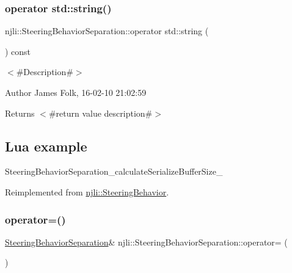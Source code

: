 \subsubsection{\texorpdfstring{operator std\+::string()}{operator std::string()}}
{\footnotesize\ttfamily njli\+::\+Steering\+Behavior\+Separation\+::operator std\+::string (\begin{DoxyParamCaption}{ }\end{DoxyParamCaption}) const\hspace{0.3cm}{\ttfamily [virtual]}}



$<$\#\+Description\#$>$ 

\begin{DoxyAuthor}{Author}
James Folk, 16-\/02-\/10 21\+:02\+:59
\end{DoxyAuthor}
\begin{DoxyReturn}{Returns}
$<$\#return value description\#$>$
\end{DoxyReturn}
\hypertarget{classnjli_1_1_steering_behavior_wander_ex1}{}\subsection{Lua example}\label{classnjli_1_1_steering_behavior_wander_ex1}

\begin{DoxyCodeInclude}
\end{DoxyCodeInclude}
Steering\+Behavior\+Separation\+\_\+calculate\+Serialize\+Buffer\+Size\+\_\+ 

Reimplemented from \mbox{\hyperlink{classnjli_1_1_steering_behavior_acd7af46e42a8a3fc1208a47f50836ac8}{njli\+::\+Steering\+Behavior}}.

\mbox{\label{classnjli_1_1_steering_behavior_separation_ab1903a1f26ca1d21e21f5610432cd94e}} 
\subsubsection{\texorpdfstring{operator=()}{operator=()}}
{\footnotesize\ttfamily \mbox{\hyperlink{classnjli_1_1_steering_behavior_separation}{Steering\+Behavior\+Separation}}\& njli\+::\+Steering\+Behavior\+Separation\+::operator= (\begin{DoxyParamCaption}\item[{const \mbox{\hyperlink{classnjli_1_1_steering_behavior_separation}{Steering\+Behavior\+Separation}} \&}]{ }\end{DoxyParamCaption})\hspace{0.3cm}{\ttfamily [protected]}}

